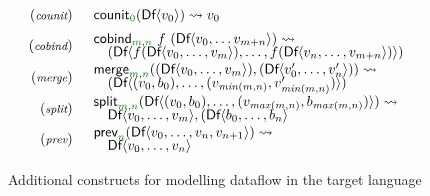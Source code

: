 \begin{figure}[t]
\begin{equation*}
\begin{array}{rl}
{\footnotesize(\emph{counit})} & \begin{array}{l}
\ident{counit}_{\cclrd{0}}(\ident{Df} \langle v_0 \rangle)   \rightsquigarrow v_0
\end{array}
\\[0.5em]
{\footnotesize(\emph{cobind})} & \begin{array}{l}
\ident{cobind}_{\cclrd{m}, \cclrd{n}}~f~(\ident{Df}\langle v_0, \ldots v_{m+n} \rangle) \rightsquigarrow
\\[-0.25em]
\quad (\ident{Df}\langle f (\ident{Df}\langle v_0, \ldots, v_m \rangle), \ldots, f (\ident{Df}\langle v_{n}, \ldots, v_{m+n} \rangle) \rangle)
\end{array}
\\[0.5em]
{\footnotesize(\emph{merge})} & \begin{array}{l}
\ident{merge}_{\cclrd{m}, \cclrd{n}} ((\ident{Df}\langle v_0, \ldots, v_m \rangle), (\ident{Df}\langle v'_0, \ldots, v'_n\rangle)) \rightsquigarrow
\\[-0.25em]
\quad (\ident{Df}\langle (v_0, b_0), \ldots, (v_{\mathit{min}(m,n)}, v'_{\mathit{min}(m,n)}) \rangle)
\end{array}
\\[0.5em]
{\footnotesize(\emph{split})} & \begin{array}{l}
\ident{split}_{\cclrd{m}, \cclrd{n}} (\ident{Df}\langle (v_0, b_0), \ldots, (v_{\mathit{max}(m,n)}, b_{\mathit{max}(m,n)}) \rangle)  \rightsquigarrow
\\[-0.25em]
\quad \ident{Df}\langle v_0, \ldots, v_m \rangle, (\ident{Df}\langle b_0, \ldots, b_n\rangle
\end{array}
\\[0.5em]
{\footnotesize(\emph{prev})} & \begin{array}{l}
\ident{prev}_{\cclrd{n}} (\ident{Df}\langle v_0, \ldots, v_n, v_{n+1} \rangle) \rightsquigarrow
\\[-0.25em]
\quad \ident{Df}\langle v_0, \ldots, v_n \rangle
\end{array}
\end{array}
\end{equation*}

\caption{Additional constructs for modelling dataflow in the target language}
\label{fig:semantics-ext-df}
\end{figure}


